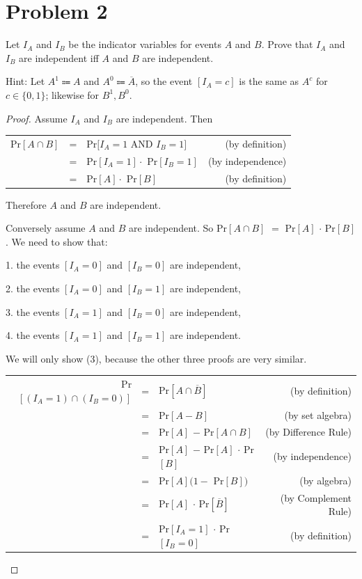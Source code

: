\documentclass[14pt]{extarticle}
\begin{document}
\section{Problem 2}
Let $I_A$ and $I_B$ be the indicator variables for events $A$ and $B$. Prove that $I_A$ and $I_B$ are independent iff $A$ and $B$ are independent.

Hint: Let $A^1 \Coloneqq A$ and $A^0 \Coloneqq\overline{A}$, so the event $[I_A = c]$ is the same as $A^c$ for $c \in \{0,1\}$; likewise for $B^1, B^0$.

\begin{proof}
Assume $I_A$ and $I_B$ are independent. Then

\begin{center}
\begin{tabular}{rclr}
Pr$[A \cap B]$ & = & Pr$[I_A = 1$ AND $I_B = 1]$ & (by definition) \\
& = & Pr$[I_A = 1] \cdot$ Pr$[I_B = 1]$ &(by independence)\\
& = & Pr$[A] \cdot $ Pr$[B]$ & (by definition)
\end{tabular}
\end{center}

Therefore $A$ and $B$ are independent.

Conversely assume $A$ and $B$ are independent. So Pr$[A \cap B]$ $=$ Pr$[A]$ $\cdot$ Pr$[B]$. We need to show that:

1. the events $[I_A = 0]$ and $[I_B = 0]$ are independent,

2. the events $[I_A = 0]$ and $[I_B = 1]$ are independent,

3. the events $[I_A = 1]$ and $[I_B = 0]$ are independent,

4. the events $[I_A = 1]$ and $[I_B = 1]$ are independent.

We will only show (3), because the other three proofs are very similar.

\begin{center}
\begin{tabular}{rclr}
Pr$[(I_A=1) \cap (I_B=0)]$ & = & Pr$[A \cap \overline{B}]$ & (by definition) \\
& = & Pr$[A - B]$ & (by set algebra)\\
& = & Pr$[A]$ $-$ Pr$[A \cap B]$ & (by Difference Rule)\\
& = & Pr$[A]$ $-$ Pr$[A]$ $\cdot$ Pr$[B]$ & (by independence)\\
& = & Pr$[A](1 - $ Pr$[B])$ & (by algebra)\\
& = & Pr$[A]$ $\cdot$ Pr$[\overline{B}]$ & (by Complement Rule)\\
& = & Pr$[I_A=1]$ $\cdot$ Pr$[I_B=0]$ & (by definition)
\end{tabular}
\end{center}

\end{proof}
\end{document}
